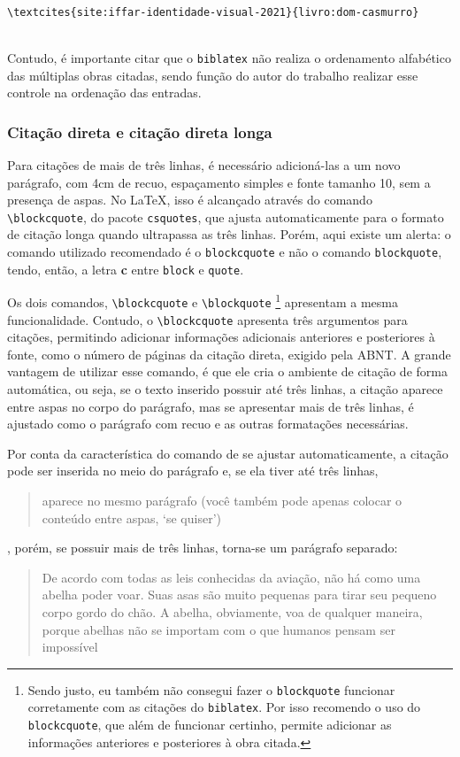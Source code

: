\cites{site:iffar-identidade-visual-2021}{livro:dom-casmurro}\\

\verb|\textcites{site:iffar-identidade-visual-2021}{livro:dom-casmurro}|

\textcites{site:iffar-identidade-visual-2021}{livro:dom-casmurro}\\

Contudo, é importante citar que o \verb|biblatex| não realiza o ordenamento alfabético das múltiplas obras citadas, sendo função do autor do trabalho realizar esse controle na ordenação das entradas.

\subsubsection{Citação direta e citação direta longa}
Para citações de mais de três linhas, é necessário adicioná-las a um novo parágrafo, com 4cm de recuo, espaçamento simples e fonte tamanho 10, sem a presença de aspas. No \LaTeX, isso é alcançado através do comando \verb|\blockcquote|, do pacote \verb|csquotes|, que ajusta automaticamente para o formato de citação longa quando ultrapassa as três linhas. Porém, aqui existe um alerta: o comando utilizado recomendado é o \texttt{blockcquote} e não o comando \texttt{blockquote}, tendo, então, a letra \textbf{c} entre \texttt{block} e \texttt{quote}.

Os dois comandos, \verb|\blockcquote| e \verb|\blockquote|%
\footnote{Sendo justo, eu também não consegui fazer o \texttt{blockquote} funcionar corretamente com as citações do \texttt{biblatex}. Por isso recomendo o uso do \texttt{blockcquote}, que além de funcionar certinho, permite adicionar as informações anteriores e posteriores à obra citada.} 
apresentam a mesma funcionalidade. Contudo, o \verb|\blockcquote| apresenta três argumentos para citações, permitindo adicionar informações adicionais anteriores e posteriores à fonte, como o número de páginas da citação direta, exigido pela ABNT. A grande vantagem de utilizar esse comando, é que ele cria o ambiente de citação de forma automática, ou seja, se o texto inserido possuir até três linhas, a citação aparece entre aspas no corpo do parágrafo, mas se apresentar mais de três linhas, é ajustado como o parágrafo com recuo e as outras formatações necessárias.

Por conta da característica do comando de se ajustar automaticamente, a citação pode ser inserida no meio do parágrafo e, se ela tiver até três linhas, \blockcquote{batman}{aparece no mesmo parágrafo (você também pode apenas colocar o conteúdo entre aspas, `se quiser')}, porém, se possuir mais de três linhas, torna-se um parágrafo separado:
\blockcquote[tradução nossa]{filme:bee-movie}{De acordo com todas as leis conhecidas da aviação, não há como uma abelha poder voar. Suas asas são muito pequenas para tirar seu pequeno corpo gordo do chão. A abelha, obviamente, voa de qualquer maneira, porque abelhas não se importam com o que humanos pensam ser impossível}

